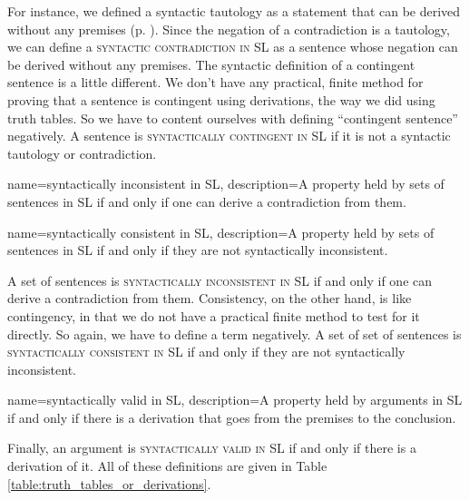 For instance, we defined a syntactic tautology as a statement that can be derived without any premises (p. \pageref{def:syntactic_tautology_in_sl}). Since the negation of a contradiction is a tautology, we can define a \textsc{\gls{syntactic contradiction in SL}} \label{def:syntactic_contradiction_in_sl} as a sentence whose negation can be derived without any premises. The syntactic definition of a contingent sentence is a little different. We don't have any practical, finite method for proving that a sentence is contingent using derivations, the way we did using truth tables. So we have to content ourselves with defining ``contingent sentence'' negatively. A sentence is \textsc{\gls{syntactically contingent in SL}} \label{def:syntactically_contingent_in_sl} if it is not a syntactic tautology or contradiction. 
 
{
name=syntactically inconsistent in SL,
description={A property held by sets of sentences in SL if and only if one can derive a contradiction from them.}
}

{
name=syntactically consistent in SL,
description={A property held by sets of sentences in SL if and only if they are not syntactically inconsistent.}
}

A set of sentences is \textsc{\gls{syntactically inconsistent in SL}} \label{def:syntactically_inconsistent_ in_sl} if and only if one can derive a contradiction from them. Consistency, on the other hand, is like contingency, in that we do not have a practical finite method to test for it directly. So again, we have to define a term negatively. A set of set of sentences is \textsc{\gls{syntactically consistent in SL}} \label{def:syntactically consistent in SL} if and only if they are not syntactically inconsistent.
    
{
name=syntactically valid in SL,
description={A property held by arguments in SL if and only if there is a derivation that goes from the premises to the conclusion.}
}

Finally, an argument is \textsc{\gls{syntactically valid in SL}} \label{def:syntactically_valid_in_SL} if and only if there is a derivation of it. All of these definitions are given in Table \ref{table:truth_tables_or_derivations}.


